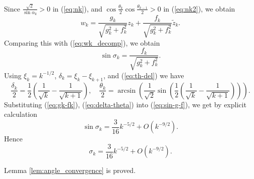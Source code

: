 \documentclass[12pt]{article}
\begin{document}
Since $\frac{\sqrt{2}}{\sin \alpha_k}>0$ in (\ref{eq:nk}), and $\cos \frac{\theta_k}{2}\cos \frac{\theta_{k-1}}{2}>0$ in (\ref{eq:nk2}),
we obtain 
$$
w_k = \frac{g_k }{\sqrt{g_k^2 + f_k^2}} z_k
+ \frac{f_k }{\sqrt{g_k^2 + f_k^2}} \tilde{z}_k.
$$
Comparing this with (\ref{eq:wk_decomp}), we obtain 
\begin{equation}\label{eq:sin-g-f}
  \sin \sigma_k = \frac{f_k }{\sqrt{g_k^2 + f_k^2}}.
\end{equation}
Using $\xi_{k}=k^{-1/2}$, $\delta_{k}= \xi_{k}-\xi_{k+1}$, and (\ref{eq:th-del}) we have
\begin{equation}\label{eq:delta-theta}
  \frac{\delta_k}{2} = \frac{1}{2}\left(\frac{1}{\sqrt{k}}-  \frac{1}{\sqrt{k+1}}\right),
\quad
\frac{\theta_{k}}{2} =  \arcsin \left(\frac{1}{\sqrt{2}} \sin \left(\frac{1}{2}\left(\frac{1}{\sqrt{k}}-  \frac{1}{\sqrt{k+1}}\right)\right)\right).
\end{equation}
Substituting (\ref{eq:gk-fk}), (\ref{eq:delta-theta}) into (\ref{eq:sin-g-f}),
we get by explicit calculation
$$
\sin \sigma_k = \frac{3}{16} k^{-5/2} + O(k^{-9/2}).
$$
Hence 
$$
\sigma_k =  \frac{3}{16} k^{-5/2} + O(k^{-9/2}).
$$

Lemma \ref{lem:angle_convergence} is proved.

\vspace*{1em}
\end{document}
